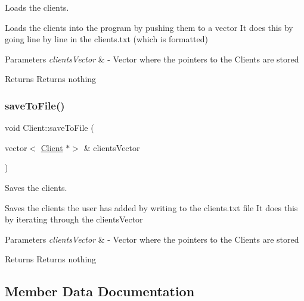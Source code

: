 Loads the clients. 

Loads the clients into the program by pushing them to a vector It does this by going line by line in the clients.\+txt (which is formatted)


\begin{DoxyParams}{Parameters}
{\em clients\+Vector} & -\/ Vector where the pointers to the Clients are stored \\
\hline
\end{DoxyParams}
\begin{DoxyReturn}{Returns}
Returns nothing 
\end{DoxyReturn}
\mbox{\label{class_client_aceebaabb74ad1e3e5b30c168e5ef681b}} 
\subsubsection{\texorpdfstring{save\+To\+File()}{saveToFile()}}
{\footnotesize\ttfamily void Client\+::save\+To\+File (\begin{DoxyParamCaption}\item[{vector$<$ \hyperlink{class_client}{Client} $\ast$$>$ \&}]{clients\+Vector }\end{DoxyParamCaption})\hspace{0.3cm}{\ttfamily [static]}}



Saves the clients. 

Saves the clients the user has added by writing to the clients.\+txt file It does this by iterating through the clients\+Vector


\begin{DoxyParams}{Parameters}
{\em clients\+Vector} & -\/ Vector where the pointers to the Clients are stored \\
\hline
\end{DoxyParams}
\begin{DoxyReturn}{Returns}
Returns nothing 
\end{DoxyReturn}


\subsection{Member Data Documentation}
\mbox{\label{class_client_a9d5dc70a6eee2fded8217a7983fe5fd0}} 
